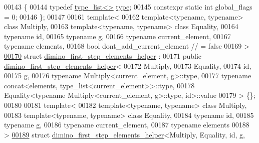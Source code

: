 \begin{DoxyCode}
00143 \{
00144   \textcolor{keyword}{typedef} \hyperlink{struct_eigen_1_1internal_1_1type__list}{type\_list<>} \hyperlink{struct_eigen_1_1internal_1_1type__list}{type};
00145   constexpr \textcolor{keyword}{static} \textcolor{keywordtype}{int} global\_flags = 0;
00146 \};
00147 
00161 \textcolor{keyword}{template}<
00162   \textcolor{keyword}{template}<\textcolor{keyword}{typename}, \textcolor{keyword}{typename}> \textcolor{keyword}{class }Multiply,
00163   \textcolor{keyword}{template}<\textcolor{keyword}{typename}, \textcolor{keyword}{typename}> \textcolor{keyword}{class }Equality,
00164   \textcolor{keyword}{typename} id,
00165   \textcolor{keyword}{typename} g,
00166   \textcolor{keyword}{typename} current\_element,
00167   \textcolor{keyword}{typename} elements,
00168   \textcolor{keywordtype}{bool} dont\_add\_current\_element   \textcolor{comment}{// = false}
00169 >
\hyperlink{struct_eigen_1_1internal_1_1group__theory_1_1dimino__first__step__elements__helper}{00170} \textcolor{keyword}{struct }\hyperlink{struct_eigen_1_1internal_1_1group__theory_1_1dimino__first__step__elements__helper}{dimino\_first\_step\_elements\_helper} :
00171   \textcolor{keyword}{public} \hyperlink{struct_eigen_1_1internal_1_1group__theory_1_1dimino__first__step__elements__helper}{dimino\_first\_step\_elements\_helper}<
00172     Multiply,
00173     Equality,
00174     id,
00175     g,
00176     typename Multiply<current\_element, g>::type,
00177     typename concat<elements, type\_list<current\_element>>::type,
00178     Equality<typename Multiply<current\_element, g>::type, id>::value
00179   > \{\};
00180 
00181 \textcolor{keyword}{template}<
00182   \textcolor{keyword}{template}<\textcolor{keyword}{typename}, \textcolor{keyword}{typename}> \textcolor{keyword}{class }Multiply,
00183   \textcolor{keyword}{template}<\textcolor{keyword}{typename}, \textcolor{keyword}{typename}> \textcolor{keyword}{class }Equality,
00184   \textcolor{keyword}{typename} id,
00185   \textcolor{keyword}{typename} g,
00186   \textcolor{keyword}{typename} current\_element,
00187   \textcolor{keyword}{typename} elements
00188 >
\hyperlink{struct_eigen_1_1internal_1_1group__theory_1_1dimino__first__step__elements__helper_3_01_multiply9b4d61ec31d850d0ed180608dd79e37f}{00189} \textcolor{keyword}{struct }\hyperlink{struct_eigen_1_1internal_1_1group__theory_1_1dimino__first__step__elements__helper}{dimino\_first\_step\_elements\_helper}<Multiply, Equality, id, g, 

\end{DoxyCode}
